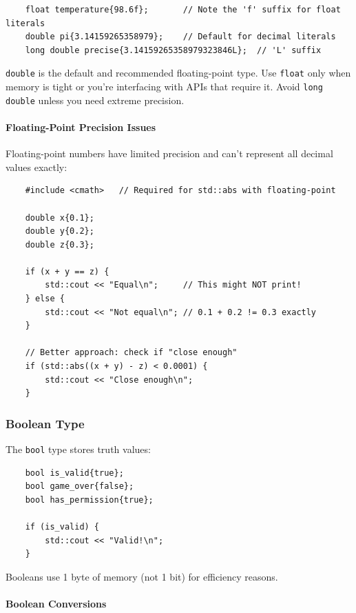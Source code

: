\begin{lstlisting}
	float temperature{98.6f};       // Note the 'f' suffix for float literals
	double pi{3.14159265358979};    // Default for decimal literals
	long double precise{3.14159265358979323846L};  // 'L' suffix
\end{lstlisting}

\begin{remark}
	\texttt{double} is the default and recommended floating-point type. Use \texttt{float} only when memory is tight or you're interfacing with APIs that require it. Avoid \texttt{long double} unless you need extreme precision.
\end{remark}

\paragraph{Floating-Point Precision Issues}

Floating-point numbers have limited precision and can't represent all decimal values exactly:

\begin{lstlisting}
	#include <cmath>   // Required for std::abs with floating-point

	double x{0.1};
	double y{0.2};
	double z{0.3};

	if (x + y == z) {
		std::cout << "Equal\n";     // This might NOT print!
	} else {
		std::cout << "Not equal\n"; // 0.1 + 0.2 != 0.3 exactly
	}

	// Better approach: check if "close enough"
	if (std::abs((x + y) - z) < 0.0001) {
		std::cout << "Close enough\n";
	}
\end{lstlisting}

\subsubsection{Boolean Type}

The \texttt{bool} type stores truth values:

\begin{lstlisting}
	bool is_valid{true};
	bool game_over{false};
	bool has_permission{true};
	
	if (is_valid) {
		std::cout << "Valid!\n";
	}
\end{lstlisting}

Booleans use 1 byte of memory (not 1 bit) for efficiency reasons.

\paragraph{Boolean Conversions}

